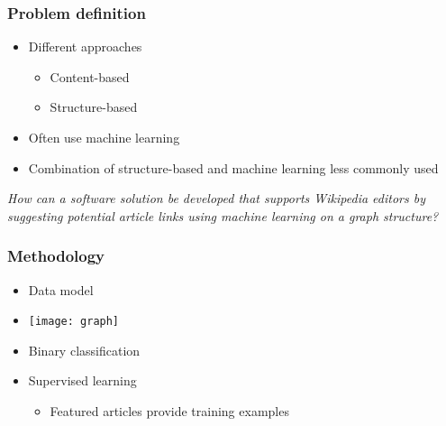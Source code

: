 \begin{frame}
    \frametitle{Problem definition}
    \centering
    \begin{itemize}
      \item Different approaches
        \begin{itemize}
          \item Content-based
          \item Structure-based
        \end{itemize}
      \item Often use machine learning
      \item Combination of structure-based and machine learning less commonly used
    \end{itemize}
    \emph{How can a software solution be developed that supports Wikipedia editors by suggesting potential article links using machine learning on a graph structure?}
\end{frame}

\begin{frame}
    \frametitle{Methodology}
    \centering
    \begin{itemize}
      \item Data model
      \item[] \texttt{[image: graph]}
      \item Binary classification
      \item Supervised learning
        \begin{itemize}
          \item Featured articles provide training examples
        \end{itemize}
    \end{itemize}
\end{frame}


